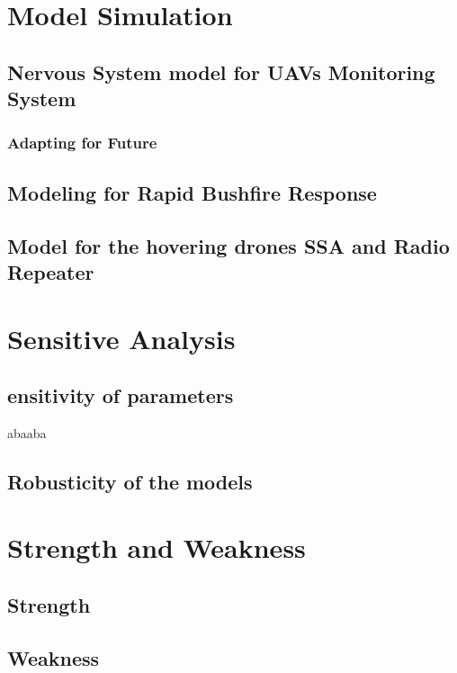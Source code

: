 \documentclass[13pt]{ctexart} %
\begin{document}
\section{Model Simulation}


\subsection{Nervous System model for UAVs Monitoring System}


\subsubsection{Adapting for Future}


\subsection{Modeling for Rapid Bushfire Response}


\subsection{Model for the hovering drones SSA and Radio Repeater}


\section{Sensitive Analysis}
\subsection{ensitivity of parameters}
abaaba
\subsection{Robusticity of the models}

\section{Strength and Weakness}
\subsection{Strength}


\subsection{Weakness}
\end{document}
